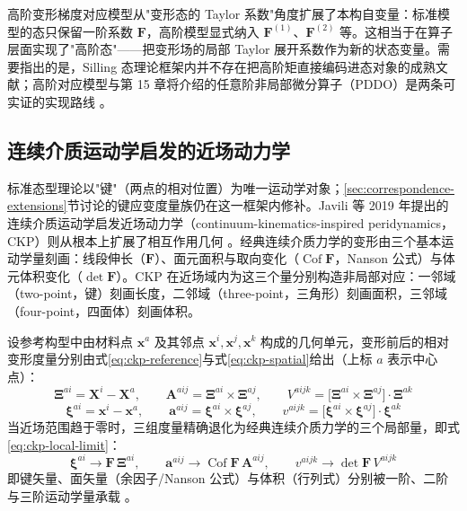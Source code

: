 \begin{remark}
  高阶变形梯度对应模型从"变形态的 Taylor 系数"角度扩展了本构自变量：标准模型的态只保留一阶系数 $\mathbf{F}$，高阶模型显式纳入 $\mathbf{F}^{(1)}$、$\mathbf{F}^{(2)}$ 等。这相当于在算子层面实现了"高阶态"——把变形场的局部 Taylor 展开系数作为新的状态变量。需要指出的是，Silling 态理论框架内并不存在把高阶矩直接编码进态对象的成熟文献；高阶对应模型与第 15 章将介绍的任意阶非局部微分算子（PDDO）是两条可实证的实现路线 \cite{ChenChan2020,Madenci2016}。
\end{remark}

\subsection{连续介质运动学启发的近场动力学}\label{sec:continuum-kinematics-pd}

标准态型理论以"键"（两点的相对位置）为唯一运动学对象；\ref{sec:correspondence-extensions}节讨论的键应变度量族仍在这一框架内修补。Javili 等 2019 年提出的连续介质运动学启发近场动力学（continuum-kinematics-inspired peridynamics，CKP）则从根本上扩展了相互作用几何 \cite{Javili2019}。经典连续介质力学的变形由三个基本运动学量刻画：线段伸长（$\mathbf{F}$）、面元面积与取向变化（$\operatorname{Cof}\mathbf{F}$，Nanson 公式）与体元体积变化（$\det\mathbf{F}$）。CKP 在近场域内为这三个量分别构造非局部对应：一邻域（two-point，键）刻画长度，二邻域（three-point，三角形）刻画面积，三邻域（four-point，四面体）刻画体积。

设参考构型中由材料点 $\mathbf{x}^{a}$ 及其邻点 $\mathbf{x}^{i},\mathbf{x}^{j},\mathbf{x}^{k}$ 构成的几何单元，变形前后的相对变形度量分别由式\eqref{eq:ckp-reference}与式\eqref{eq:ckp-spatial}给出（上标 $a$ 表示中心点）：
\begin{equation}
  \boldsymbol{\Xi}^{ai}=\mathbf{X}^{i}-\mathbf{X}^{a},\qquad
  \mathbf{A}^{aij}=\boldsymbol{\Xi}^{ai}\times\boldsymbol{\Xi}^{aj},\qquad
  V^{aijk}=\bigl[\boldsymbol{\Xi}^{ai}\times\boldsymbol{\Xi}^{aj}\bigr]\cdot\boldsymbol{\Xi}^{ak}
  \label{eq:ckp-reference}
\end{equation}
\begin{equation}
  \boldsymbol{\xi}^{ai}=\mathbf{x}^{i}-\mathbf{x}^{a},\qquad
  \mathbf{a}^{aij}=\boldsymbol{\xi}^{ai}\times\boldsymbol{\xi}^{aj},\qquad
  v^{aijk}=\bigl[\boldsymbol{\xi}^{ai}\times\boldsymbol{\xi}^{aj}\bigr]\cdot\boldsymbol{\xi}^{ak}
  \label{eq:ckp-spatial}
\end{equation}
当近场范围趋于零时，三组度量精确退化为经典连续介质力学的三个局部量，即式\eqref{eq:ckp-local-limit}：
\begin{equation}
  \boldsymbol{\xi}^{ai}\to\mathbf{F}\,\boldsymbol{\Xi}^{ai},\qquad
  \mathbf{a}^{aij}\to\operatorname{Cof}\mathbf{F}\,\mathbf{A}^{aij},\qquad
  v^{aijk}\to\det\mathbf{F}\,V^{aijk}
  \label{eq:ckp-local-limit}
\end{equation}
即键矢量、面矢量（余因子/Nanson 公式）与体积（行列式）分别被一阶、二阶与三阶运动学量承载 \cite{Javili2019}。

